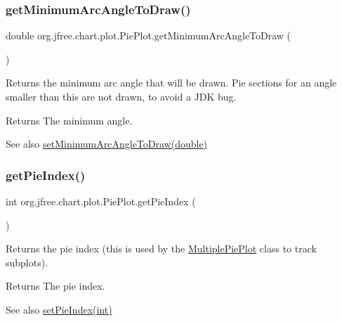 \subsubsection{\texorpdfstring{get\+Minimum\+Arc\+Angle\+To\+Draw()}{getMinimumArcAngleToDraw()}}
{\footnotesize\ttfamily double org.\+jfree.\+chart.\+plot.\+Pie\+Plot.\+get\+Minimum\+Arc\+Angle\+To\+Draw (\begin{DoxyParamCaption}{ }\end{DoxyParamCaption})}

Returns the minimum arc angle that will be drawn. Pie sections for an angle smaller than this are not drawn, to avoid a J\+DK bug.

\begin{DoxyReturn}{Returns}
The minimum angle.
\end{DoxyReturn}
\begin{DoxySeeAlso}{See also}
\mbox{\hyperlink{classorg_1_1jfree_1_1chart_1_1plot_1_1_pie_plot_a1092c8623f27b65bb09368904b96ff4b}{set\+Minimum\+Arc\+Angle\+To\+Draw(double)}} 
\end{DoxySeeAlso}
\mbox{\label{classorg_1_1jfree_1_1chart_1_1plot_1_1_pie_plot_a455d67f5bfb17e8fbbd592ca573916fa}} 
\subsubsection{\texorpdfstring{get\+Pie\+Index()}{getPieIndex()}}
{\footnotesize\ttfamily int org.\+jfree.\+chart.\+plot.\+Pie\+Plot.\+get\+Pie\+Index (\begin{DoxyParamCaption}{ }\end{DoxyParamCaption})}

Returns the pie index (this is used by the \mbox{\hyperlink{classorg_1_1jfree_1_1chart_1_1plot_1_1_multiple_pie_plot}{Multiple\+Pie\+Plot}} class to track subplots).

\begin{DoxyReturn}{Returns}
The pie index.
\end{DoxyReturn}
\begin{DoxySeeAlso}{See also}
\mbox{\hyperlink{classorg_1_1jfree_1_1chart_1_1plot_1_1_pie_plot_a9d05917a58c4ccab100f948d81f3d3be}{set\+Pie\+Index(int)}} 
\end{DoxySeeAlso}
\mbox{\label{classorg_1_1jfree_1_1chart_1_1plot_1_1_pie_plot_a8fa087aa09e2d64393832e1295d9cdd9}} 
